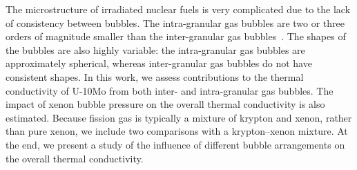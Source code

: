 The microstructure of irradiated nuclear fuels is very complicated due to the lack of consistency between bubbles. The intra-granular gas bubbles are two or three orders of magnitude smaller than the inter-granular gas bubbles~\cite{hu2015assessment}. The shapes of the bubbles are also highly variable: the intra-granular gas bubbles are approximately spherical, whereas inter-granular gas bubbles do not have consistent shapes. In this work, we assess contributions to the thermal conductivity of \mbox{U-10Mo} from both inter- and intra-granular gas bubbles. The impact of xenon bubble pressure on the overall thermal conductivity is also estimated.
{Because fission gas is typically a mixture of krypton and
xenon, rather than pure xenon, we include two comparisons with a krypton--xenon
mixture.}
At the end, we present a study of the influence of different bubble arrangements on the overall thermal conductivity.

 

